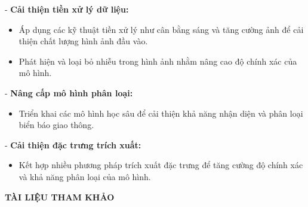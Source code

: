 \documentclass[a4paper,12pt]{article}
\begin{document}
- \textbf{Cải thiện tiền xử lý dữ liệu:}
    \begin{itemize}
        \item Áp dụng các kỹ thuật tiền xử lý như cân bằng sáng và tăng cường ảnh để cải thiện chất lượng hình ảnh đầu vào.
        \item Phát hiện và loại bỏ nhiễu trong hình ảnh nhằm nâng cao độ chính xác của mô hình.
    \end{itemize}

- \textbf{Nâng cấp mô hình phân loại:}
    \begin{itemize}
        \item Triển khai các mô hình học sâu để cải thiện khả năng nhận diện và phân loại biển báo giao thông.
    \end{itemize}

- \textbf{Cải thiện đặc trưng trích xuất:}
    \begin{itemize}
        \item Kết hợp nhiều phương pháp trích xuất đặc trưng để tăng cường độ chính xác và khả năng phân loại của mô hình.
    \end{itemize}

\newpage
\thispagestyle{empty}
\begin{center}
    \textbf{\large TÀI LIỆU THAM KHẢO}
\end{center}
\vspace{1cm}
\sloppy
\printbibliography
\end{document}
